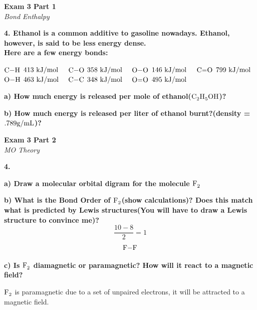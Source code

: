 \documentclass{article}
\begin{document}
    \begin{center}
        \textbf{Exam 3 Part 1}\\
        \textit{Bond Enthalpy}
    \end{center}
    \textbf{4. Ethanol is a common additive to gasoline nowadays. Ethanol, however, is said to be less energy dense.\\ Here are a few energy bonds:}
    \begin{center}
        $\ce{C-H}$ $413 \  \si[per-mode=symbol]{\kilo\joule\per\mol} \quad$
        $\ce{C-O}$ $358 \ \si[per-mode=symbol]{\kilo\joule\per\mol} \quad$
        $\ce{O-O}$ $146 \  \si[per-mode=symbol]{\kilo\joule\per\mol} \quad$
        $\ce{C=O}$ $799 \  \si[per-mode=symbol]{\kilo\joule\per\mol}$\\[.2cm]
        $\ce{O-H}$ $463 \  \si[per-mode=symbol]{\kilo\joule\per\mol} \quad$
        $\ce{C-C}$ $348 \  \si[per-mode=symbol]{\kilo\joule\per\mol} \quad$
        $\ce{O=O}$ $495 \  \si[per-mode=symbol]{\kilo\joule\per\mol}$
    \end{center}

    \textbf{a) How much energy is released per mole of ethanol($\ce{C2H5OH}$)?}

    \textbf{b) How much energy is released per liter of ethanol burnt?(density = $.789 \si[per-mode=symbol]{\gram\per\milli\liter}$)?}
    \pagebreak

    \begin{center}
        \textbf{Exam 3 Part 2}\\
        \textit{MO Theory}
    \end{center}
    \textbf{4.}

    \textbf{a) Draw a molecular orbital digram for the molecule $\ce{F2}$}

    \textbf{b) What is the Bond Order of $\ce{F2}$(show calculations)? Does this match what is predicted by Lewis structures(You will have to draw a Lewis structure to convince me)?}
    $$ \dfrac{10 - 8}{2} = 1$$
    $$ \ce{F-F}$$

    \textbf{c) Is $\ce{F2}$ diamagnetic or paramagnetic? How will it react to a magnetic field?}

    $\ce{F2}$ is paramagnetic due to a set of  unpaired electrons, it will be attracted to a magnetic field.
    \pagebreak
\end{document}
